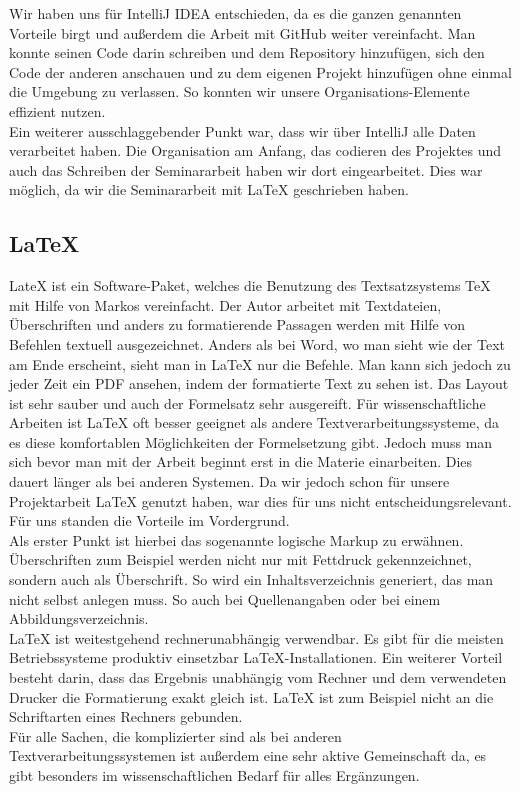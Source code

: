 	Wir haben uns für IntelliJ IDEA entschieden, da es die ganzen genannten Vorteile birgt und außerdem die Arbeit mit GitHub weiter vereinfacht. Man konnte seinen Code darin schreiben und dem Repository hinzufügen, sich den Code der anderen anschauen und zu dem eigenen Projekt hinzufügen ohne einmal die Umgebung zu verlassen.  So konnten wir unsere Organisations-Elemente effizient nutzen. 
	\\Ein weiterer ausschlaggebender Punkt war, dass wir über IntelliJ alle Daten verarbeitet haben. Die Organisation am Anfang, das codieren des Projektes und auch das Schreiben der Seminararbeit haben wir dort eingearbeitet. Dies war möglich, da wir die Seminararbeit mit LaTeX geschrieben haben.
	
	\subsection{LaTeX}\label{latex}
	LateX ist ein Software-Paket, welches die Benutzung des Textsatzsystems TeX mit Hilfe von Markos vereinfacht. Der Autor arbeitet mit Textdateien, Überschriften und anders zu formatierende Passagen werden mit Hilfe von Befehlen textuell ausgezeichnet. Anders als bei Word, wo man sieht wie der Text am Ende erscheint, sieht man in LaTeX nur die Befehle. Man kann sich jedoch zu jeder Zeit ein PDF ansehen, indem der formatierte Text zu sehen ist. Das Layout ist sehr sauber und auch der Formelsatz sehr ausgereift. Für wissenschaftliche Arbeiten ist LaTeX oft besser geeignet als andere Textverarbeitungssysteme, da es diese komfortablen Möglichkeiten der Formelsetzung gibt. Jedoch muss man sich bevor man mit der Arbeit beginnt erst in die Materie einarbeiten. Dies dauert länger als bei anderen Systemen. Da wir jedoch schon für unsere Projektarbeit LaTeX genutzt haben, war dies für uns nicht entscheidungsrelevant. Für uns standen die Vorteile im Vordergrund.
	\\Als erster Punkt ist hierbei das sogenannte logische Markup zu erwähnen. Überschriften zum Beispiel werden nicht nur mit Fettdruck gekennzeichnet, sondern auch als Überschrift. So wird ein Inhaltsverzeichnis generiert, das man nicht selbst anlegen muss. So auch bei Quellenangaben oder bei einem Abbildungsverzeichnis.
	\\LaTeX ist weitestgehend rechnerunabhängig verwendbar. Es gibt für die meisten Betriebssysteme produktiv einsetzbar LaTeX-Installationen. Ein weiterer Vorteil besteht darin, dass das Ergebnis unabhängig vom Rechner und dem verwendeten Drucker die Formatierung exakt gleich ist. LaTeX ist zum Beispiel nicht an die Schriftarten eines Rechners gebunden.
	\\Für alle Sachen, die komplizierter sind als bei anderen Textverarbeitungssystemen ist außerdem eine sehr aktive Gemeinschaft da, es gibt besonders im wissenschaftlichen Bedarf für alles Ergänzungen.
	
